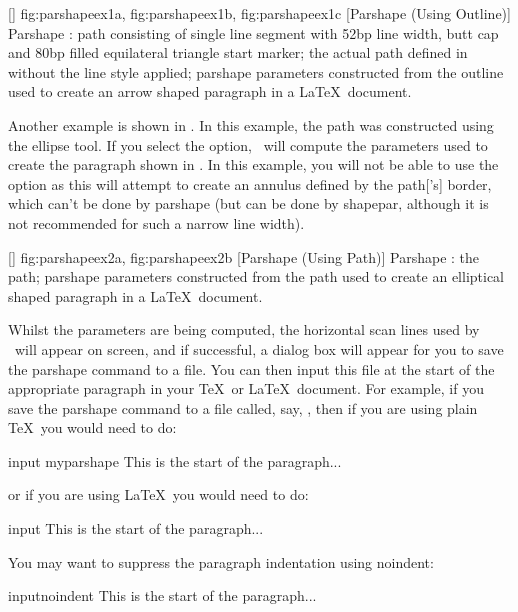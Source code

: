[\small]
{
  {fig:parshapeex1a}{}{},
  {fig:parshapeex1b}{}{},
  {fig:parshapeex1c}{}{}
}
[Parshape (Using Outline)]
{Parshape :
 path consisting of
single line segment with 52bp line width, butt cap and 80bp filled
equilateral triangle start marker;
 the actual path
defined in  without the line style applied;
\gls{parshape} parameters constructed from the outline
 used to create an arrow shaped paragraph in a \LaTeX\
document.}

Another example is shown in . In this
example, the \gls*{path} was constructed using the ellipse tool. If you
select the \widget{parshape.use_path} option, \FlowframTk\ will compute the
parameters used to create the paragraph shown in
. In this example, you will not be
able to use the  option as this will attempt to
create an annulus defined by the \gls*{path}['s] border, which can't be
done by \gls{parshape} (but can be done by \gls{shapepar},
although it is not recommended for such a narrow line width).

[\small]
{
 {fig:parshapeex2a}{}{},
 {fig:parshapeex2b}{}{}
}
[Parshape (Using Path)]
{Parshape :
 the path;
 \gls{parshape} parameters constructed from the 
path \subfigref{fig:parshapeex2a}
used to create an elliptical shaped paragraph in a \LaTeX\ document.}

Whilst the parameters are being computed, the horizontal
scan lines used by \FlowframTk\ will appear on screen, and if
successful, a dialog box will appear for you to save the
\gls{parshape} command to a file. You can then input this
file at the start of the appropriate paragraph in your \TeX\ or
\LaTeX\ document. For example, if you save the \gls{parshape}
command to a file called, say, , then if
you are using plain \TeX\ you would need to do:
\begin{codebox*}
\gls{input} myparshape
This is the start of the paragraph...
\end{codebox*}
or if you are using \LaTeX\ you would need to do:
\begin{codebox}
\gls{input}\comment{}
This is the start of the paragraph...
\end{codebox}
You may want to suppress the paragraph indentation using
\gls{noindent}:
\begin{codebox}
\gls{input}\gls{noindent}
This is the start of the paragraph...
\end{codebox}

